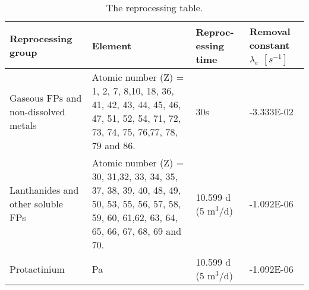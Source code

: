 \begin{table}[ht!]
	\centering
	\caption{The reprocessing table.} 
	\vspace{1ex}
	\begin{tabularx}{\textwidth}{|p{2.3cm}|p{4.5cm}|s|p{2cm}|}
		\hline
		\textbf{Reprocessing group}  & \textbf{Element} & \textbf{Reproc- essing time} & \textbf{Removal constant} $\lambda_{e}$ $[s^{-1}]$ \\
		\hline
		Gaseous \gls{FPs} and non-dissolved metals  &  Atomic number (Z) = 1, 2, 7, 8,10, 18, 36, 41, 42, 43, 44, 45, 46, 47, 51, 52, 54, 71, 72, 73, 74, 75, 76,77, 78, 79 and 86.			&	30s	&  -3.333E-02 \\
		\hline
		Lanthanides and other soluble \gls{FPs}     & Atomic number (Z) = 30, 31,32, 33, 34, 35, 37, 38, 39, 40, 48, 49, 50, 53, 55, 56, 57, 58, 59, 60, 61,62, 63, 64, 65, 66, 67, 68, 69 and 70. & 10.599 d (5 m$^3$/d) &  -1.092E-06 \\
		\hline
		Protactinium   & Pa  &  10.599 d (5 m$^3$/d)  &  -1.092E-06 \\
		\hline
	\end{tabularx}
	\label{tab:table6}
\end{table}

